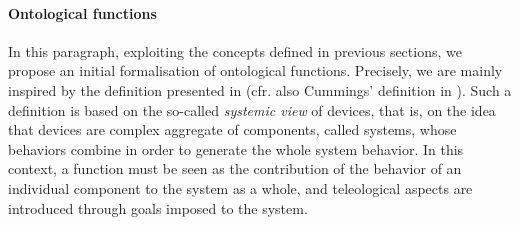 \documentclass[sw]{iosart2x}
\newcommand{\firstTimeKeyWord}[1]{\textit{#1}}
\newcommand{\myComment}[1]{}
\begin{document}
\paragraph{Ontological functions}
In this paragraph, exploiting the concepts defined in previous sections, we propose an initial formalisation of ontological functions. 
Precisely, we are mainly inspired by the definition presented in \cite{mizoguchiUnifyingDefinitionArtifact2016} (cfr. also Cummings' definition in \cite{cumminsFunctionalAnalysis1975}).
Such a definition is based on the so-called \firstTimeKeyWord{systemic view} of devices, that is, on the idea that devices are complex aggregate of components, called systems, whose behaviors combine in order to generate the whole system behavior. 
In this context, a function must be seen as the contribution of the behavior of an individual component to the system as a whole, and teleological aspects are introduced through goals imposed to \myComment{selected for} the system.  


\end{document}
